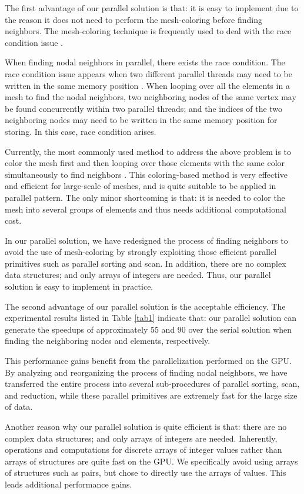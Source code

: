 \documentclass[twocolumn]{svjour3}          \smartqed  \usepackage{graphicx}
\begin{document}
The first advantage of our parallel solution is that: it is easy to 
implement due to the reason it does not need to perform the mesh-coloring 
before finding neighbors. The mesh-coloring technique is frequently used to 
deal with the race condition issue \cite{06}. 

When finding nodal neighbors in parallel, there exists the race condition. 
The race condition issue appears when two different parallel threads may 
need to be written in the same memory position \cite{06}. When 
looping over all the elements in a mesh to find the nodal neighbors, two 
neighboring nodes of the same vertex may be found concurrently within two 
parallel threads; and the indices of the two neighboring nodes may need to 
be written in the same memory position for storing. In this case, race 
condition arises. 

Currently, the most commonly used method to address the above problem is to 
color the mesh first and then looping over those elements with the same 
color simultaneously to find neighbors \cite{04_Chen2014,06,07,08_Benitez2014,09_Cheng2015}. This coloring-based 
method is very effective and efficient for large-scale of meshes, and is 
quite suitable to be applied in parallel pattern. The only minor shortcoming 
is that: it is needed to color the mesh into several groups of elements and 
thus needs additional computational cost. 

In our parallel solution, we have redesigned the process of finding 
neighbors to avoid the use of mesh-coloring by strongly exploiting those 
efficient parallel primitives such as parallel sorting and scan. In 
addition, there are no complex data structures; and only arrays of integers 
are needed. Thus, our parallel solution is easy to implement in practice. 

The second advantage of our parallel solution is the acceptable efficiency. 
The experimental results listed in Table \ref{tab1} indicate that: our parallel 
solution can generate the speedups of approximately 55 and 90 over the 
serial solution when finding the neighboring nodes and elements, 
respectively. 

This performance gains benefit from the parallelization performed on the 
GPU. By analyzing and reorganizing the process of finding nodal neighbors, 
we have transferred the entire process into several sub-procedures of 
parallel sorting, scan, and reduction, while these parallel primitives are 
extremely fast for the large size of data.

Another reason why our parallel solution is quite efficient is that: there 
are no complex data structures; and only arrays of integers are needed. 
Inherently, operations and computations for discrete arrays of integer 
values rather than arrays of structures are quite fast on the GPU. We 
specifically avoid using arrays of structures such as pairs, but chose to 
directly use the arrays of values. This leads additional performance gains. 
\end{document}
